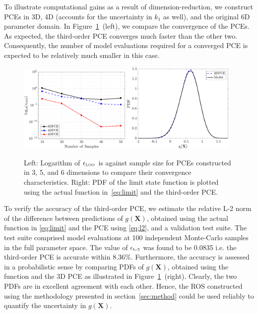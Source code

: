 To illustrate computational gains as a
result of dimension-reduction, we construct PCEs in 3D, 4D (accounts for the
uncertainty in $k_1$ as well), and the original 6D parameter domain. In
Figure~\ref{fig:conv_osc}~(left), we compare the convergence of the
PCEs. As expected, the third-order PCE converges much faster than the other
two. Consequently, the number of model evaluations required for a converged PCE
is expected to be relatively much smaller in this case.  
\begin{figure}[htbp]
 \begin{center}
  \includegraphics[width=0.48\textwidth]{./Figures/err_samples_oscillator}
  \includegraphics[width=0.48\textwidth]{./Figures/pdf_comp_oscillator}
\caption{Left: Logarithm of $\epsilon_{\mbox{\tiny{LOO}}}$ is against sample size for 
PCEs constructed in 3, 5, and 6 dimensions to compare their convergence characteristics. 
Right: PDF of the limit state function is plotted using the actual function in~\eqref{eq:limit}
and the third-order PCE.}
\label{fig:conv_osc}
\end{center}
\end{figure}

To verify the accuracy of the third-order PCE, we estimate the relative L-2
norm of the difference between predictions of  $g(\bm{X})$, obtained using the
actual function in \eqref{eq:limit} and the 
PCE using \eqref{eq:l2}, and a validation test suite. The test suite comprised
model evaluations at 100 independent Monte-Carlo samples in the full 
parameter space. The value of $\epsilon_{\mbox{\tiny{L-2}}}$ 
was found to be 0.0835 i.e. the third-order PCE is accurate within 8.36$\%$.
Furthermore, the accuracy is assessed in a probabilistic sense by comparing
PDFs of $g(\bm{X})$, obtained using the function and the 3D PCE as illustrated
in Figure~\ref{fig:conv_osc}~(right).  Clearly, the two PDFs are in excellent
agreement with each other. Hence, the ROS constructed using the methodology
presented in section~\ref{sec:method} could be used reliably to 
quantify the uncertainty in $g(\bm{X})$.

